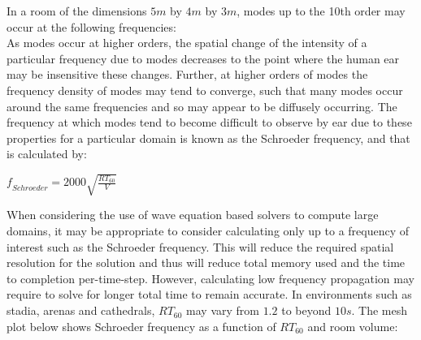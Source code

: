 In a room of the dimensions $5m$ by $4m$ by $3m$, modes up to the 10th order may occur at the following frequencies:\\

As modes occur at higher orders, the spatial change of the intensity of a particular frequency due to modes decreases to the point where the human ear may be insensitive these changes. Further, at higher orders of modes the frequency density of modes may tend to converge, such that many modes occur around the same frequencies and so may appear to be diffusely occurring. The frequency at which modes tend to become difficult to observe by ear due to these properties for a particular domain is known as the Schroeder frequency, and that is calculated by:\\
\begin{center}
$ \textit{f}_{Schroeder} = 2000 \sqrt{\frac{RT_{60}}{V}} $\\
\end{center}
When considering the use of wave equation based solvers to compute large domains, it may be appropriate to consider calculating only up to a frequency of interest such as the Schroeder frequency. This will reduce the required spatial resolution for the solution and thus will reduce total memory used and the time to completion per-time-step. However, calculating low frequency propagation may require to solve for longer total time to remain accurate. In environments such as stadia, arenas and cathedrals, $RT_{60}$ may vary from $1.2$ to beyond $10s$. The mesh plot below shows Schroeder frequency as a function of $RT_{60}$ and room volume: \\


